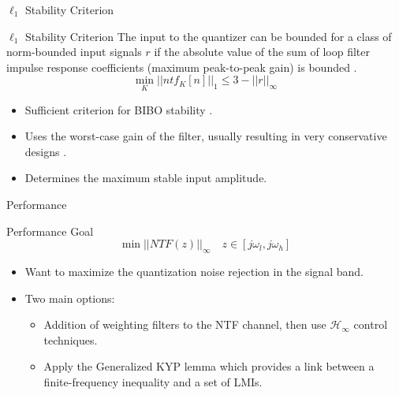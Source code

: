 \documentclass[10pt,usenames,dvipsnames]{beamer}
\begin{document}
\begin{frame}{$\ell_1$ Stability Criterion}

\begin{block}{$\ell_1$ Stability Criterion}
	The input to the quantizer can be bounded for a class of norm-bounded input signals $r$ if the absolute value of the sum of loop filter impulse response coefficients (maximum peak-to-peak gain) is bounded .
	\begin{equation*}
		\min_K ||ntf_K[n]||_1 \leq 3 - ||r||_\infty
	\end{equation*}
\end{block}

\begin{itemize}
	\item Sufficient criterion for BIBO stability \cite{Anastassiou1989}.
	\item Uses the worst-case gain of the filter, usually resulting in very conservative designs \cite{Risbo1994}.
	\item Determines the maximum stable input amplitude.
\end{itemize}

\end{frame}

\begin{frame}{Performance}

\begin{block}{Performance Goal}
	\begin{equation*}
		\min ||NTF(z)||_\infty \quad z \in [j\omega_l, j\omega_h]
	\end{equation*}
\end{block}

\begin{itemize}
	\item Want to maximize the quantization noise rejection in the signal band.
	\item Two main options:
	\begin{itemize}
		\item Addition of weighting filters to the NTF channel, then use $\mathcal{H}_\infty$ control techniques.
		\item Apply the Generalized KYP lemma which provides a link between a finite-frequency inequality and a set of LMIs.
	\end{itemize}
\end{itemize}

\end{frame}
\end{document}
